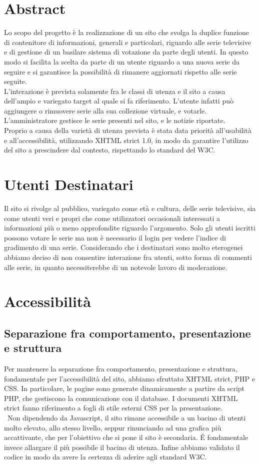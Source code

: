 \documentclass{tecweb}
\begin{document}
	\section{Abstract}
	Lo scopo del progetto è la realizzazione di un sito che svolga la duplice funzione di contenitore di informazioni, generali e particolari, riguardo alle serie televisive e di gestione di un basilare sistema di votazione da parte degli utenti. In questo modo si facilita la scelta da parte di un utente riguardo a una nuova serie da seguire e si garantisce la possibilità di rimanere aggiornati rispetto alle serie seguite. \\
	L'interazione è prevista solamente fra le classi di utenza e il sito a causa dell'ampio e variegato target al quale si fa riferimento. L'utente infatti può aggiungere o rimuovere serie alla sua collezione virtuale, e votarle. L'amministratore gestisce le serie presenti nel sito, e le notizie riportate. \\
	Proprio a causa della varietà di utenza prevista è stata data priorità all'usabilità e all'accessibilità, utilizzando XHTML strict 1.0, in modo da garantire l'utilizzo del sito a prescindere dal contesto, rispettando lo standard del W3C.
	\newpage
	\section{Utenti Destinatari}
	Il sito si rivolge al pubblico, variegato come età e cultura, delle serie televisive, sia come utenti veri e propri che come utilizzatori occasionali interessati a informazioni più o meno approfondite riguardo l'argomento. Solo gli utenti iscritti possono votare le serie ma non è necessario il login per vedere l'indice di gradimento di una serie. Considerando che i destinatari sono molto eterogenei abbiamo deciso di non consentire interazione fra utenti, sotto forma di commenti alle serie, in quanto necessiterebbe di un notevole lavoro di moderazione.
	\newpage
	
	
	\section{Accessibilità} \label{Utenti destinatari}
	\subsection{Separazione fra comportamento, presentazione e struttura}
	Per mantenere la separazione fra comportamento, presentazione e struttura, fondamentale per l'accessibilità del sito, abbiamo sfruttato XHTML strict, PHP e CSS. In particolare, le pagine sono generate dinamicamente a partire da script PHP, che gestiscono la comunicazione con il database. I documenti XHTML strict fanno riferimento a fogli di stile esterni CSS per la presentazione.\\\
	Non dipendendo da Javascript, il sito rimane accessibile a un bacino di utenti molto elevato, allo stesso livello, seppur rinunciando ad una grafica più accattivante, che per l'obiettivo che si pone il sito è secondaria. \'E fondamentale invece allargare il più possibile il bacino di utenza.
	Infine abbiamo validato il codice in modo da avere la certezza di aderire agli standard W3C.
\end{document}
